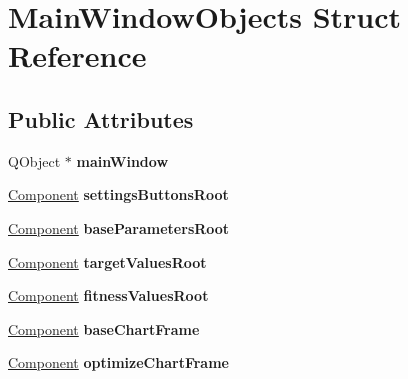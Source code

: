 \hypertarget{struct_main_window_objects}{}\section{Main\+Window\+Objects Struct Reference}
\label{struct_main_window_objects}
\subsection*{Public Attributes}
\begin{DoxyCompactItemize}
\item 
\mbox{\label{struct_main_window_objects_ab6864383c5a6b6b5e2bf103d95ed36ce}} 
Q\+Object $\ast$ {\bfseries main\+Window}
\item 
\mbox{\label{struct_main_window_objects_a005329df1cbb43b6a5efada959b08109}} 
\hyperlink{struct_component}{Component} {\bfseries settings\+Buttons\+Root}
\item 
\mbox{\label{struct_main_window_objects_abdfa7ef5b54f46708493aa75bc8857b8}} 
\hyperlink{struct_component}{Component} {\bfseries base\+Parameters\+Root}
\item 
\mbox{\label{struct_main_window_objects_a1c9dfd930602bbe606b2c9e23eaf1e7a}} 
\hyperlink{struct_component}{Component} {\bfseries target\+Values\+Root}
\item 
\mbox{\label{struct_main_window_objects_a9baa2379c0784fa902c370c22364d53a}} 
\hyperlink{struct_component}{Component} {\bfseries fitness\+Values\+Root}
\item 
\mbox{\label{struct_main_window_objects_a7377475ac90b86521112633e35a7455d}} 
\hyperlink{struct_component}{Component} {\bfseries base\+Chart\+Frame}
\item 
\mbox{\label{struct_main_window_objects_a327f6ab5bc103545a2bdf71af2709bb1}} 
\hyperlink{struct_component}{Component} {\bfseries optimize\+Chart\+Frame}
\item 
\mbox{\label{struct_main_window_objects_a641ea5e0d975030e97f61e691754688d}} 

\end{DoxyCompactItemize}
